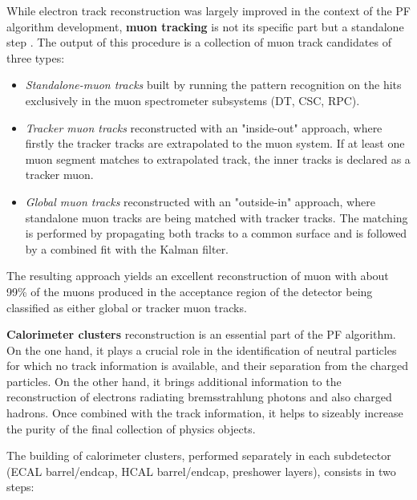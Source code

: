 While electron track reconstruction was largely improved in the context of the PF algorithm development, \textbf{muon tracking} is not its specific part but a standalone step \cite{CMS:2018rym}. The output of this procedure is a collection of muon track candidates of three types:

\begin{itemize}
    \item \textit{Standalone-muon tracks} built by running the pattern recognition on the hits exclusively in the muon spectrometer subsystems (DT, CSC, RPC).
    \item \textit{Tracker muon tracks} reconstructed with an "inside-out" approach, where firstly the tracker tracks are extrapolated to the muon system. If at least one muon segment matches to extrapolated track, the inner tracks is declared as a tracker muon.
    \item \textit{Global muon tracks} reconstructed with an "outside-in" approach, where standalone muon tracks are being matched with tracker tracks. The matching is performed by propagating both tracks to a common surface and is followed by a combined fit with the Kalman filter. 
\end{itemize}
The resulting approach yields an excellent reconstruction of muon with about 99\% of the muons produced in the acceptance region of the detector being classified as either global or tracker muon tracks.

\textbf{Calorimeter clusters} reconstruction is an essential part of the PF algorithm. On the one hand, it plays a crucial role in the identification of neutral particles for which no track information is available, and their separation from the charged particles. On the other hand, it brings additional information to the reconstruction of electrons radiating bremsstrahlung  photons and also charged hadrons. Once combined with the track information, it helps to sizeably increase the purity of the final collection of physics objects.

The building of calorimeter clusters, performed separately in each subdetector (ECAL barrel/endcap, HCAL barrel/endcap, preshower layers), consists in two steps: 

